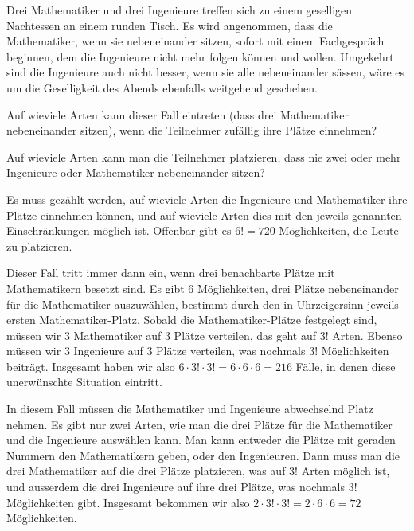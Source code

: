 Drei Mathematiker und drei Ingenieure treffen sich zu einem
geselligen Nachtessen an einem runden Tisch.
Es wird angenommen, dass die Mathematiker, wenn sie nebeneinander
sitzen, sofort mit einem Fachgespräch beginnen, dem
die Ingenieure nicht mehr folgen können und wollen. Umgekehrt
sind die Ingenieure auch nicht besser, wenn sie alle nebeneinander
sässen, wäre es um die Geselligkeit des Abends ebenfalls weitgehend
geschehen.
\begin{teilaufgaben}
\item
Auf wieviele Arten kann dieser Fall eintreten (dass drei Mathematiker
nebeneinander sitzen),
wenn die Teilnehmer zufällig ihre Plätze einnehmen?
\item
Auf wieviele Arten kann man die Teilnehmer platzieren, dass nie zwei oder
mehr Ingenieure oder Mathematiker nebeneinander sitzen?
\end{teilaufgaben}


\begin{loesung}
Es muss gezählt werden, auf wieviele Arten die Ingenieure und Mathematiker
ihre Plätze einnehmen können, und auf wieviele Arten dies mit den
jeweils genannten Einschränkungen möglich ist. Offenbar gibt es $6!=720$
Möglichkeiten, die Leute zu platzieren.
\begin{teilaufgaben}
\item Dieser Fall tritt immer dann ein, wenn drei benachbarte Plätze
mit Mathematikern besetzt sind.
Es gibt 6 Möglichkeiten, drei Plätze
nebeneinander für die Mathematiker auszuwählen, bestimmt durch den
in Uhrzeigersinn jeweils ersten Mathematiker-Platz.
Sobald die Mathematiker-Plätze festgelegt sind, müssen wir 3 Mathematiker
auf 3 Plätze verteilen, das geht auf $3!$ Arten. Ebenso müssen wir
3 Ingenieure auf 3 Plätze verteilen, was nochmals $3!$ Möglichkeiten
beiträgt. Insgesamt haben wir also $6\cdot 3!\cdot 3!=6\cdot 6\cdot 6=216$
Fälle, in denen diese unerwünschte Situation eintritt.
\item In diesem Fall müssen die Mathematiker und Ingenieure abwechselnd
Platz nehmen. Es gibt nur zwei Arten, wie man die drei Plätze für die
Mathematiker und die Ingenieure auswählen kann. Man kann entweder die
Plätze mit geraden Nummern den Mathematikern geben, oder den Ingenieuren.
Dann muss man die drei Mathematiker auf die drei Plätze platzieren,
was auf $3!$ Arten möglich ist, und ausserdem die drei Ingenieure auf
ihre drei Plätze, was nochmals $3!$ Möglichkeiten gibt. Insgesamt bekommen
wir also $2\cdot 3!\cdot 3!=2\cdot 6\cdot 6=72$ Möglichkeiten.
\qedhere
\end{teilaufgaben}
\end{loesung}
